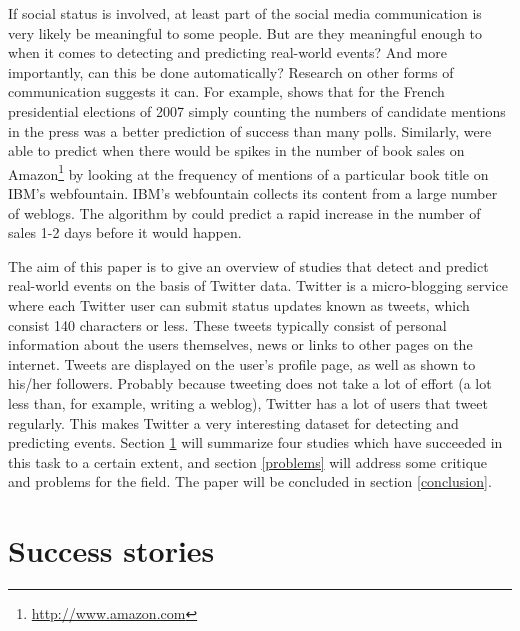 \documentclass[12pt]{article}
\begin{document}

If social status is involved, at least part of the social media communication is very likely be meaningful to some people. But are they meaningful enough to when it comes to detecting and predicting real-world events? And more importantly, can this be done automatically? Research on other forms of communication suggests it can. For example,  shows that for the French presidential elections of 2007 simply counting the numbers of candidate mentions in the press was a better prediction of success than many polls. Similarly,  were able to predict when there would be spikes in the number of book sales on Amazon\footnote{\url{http://www.amazon.com}} by looking at the frequency of mentions of a particular book title on IBM's webfountain. IBM's webfountain collects its content from a large number of weblogs. The algorithm by  could predict a rapid increase in the number of sales 1-2 days before it would happen.

The aim of this paper is to give an overview of studies that detect and predict real-world events on the basis of Twitter data. Twitter is a micro-blogging service where each Twitter user can submit status updates known as tweets, which consist 140 characters or less. These tweets typically consist of personal information about the users themselves, news or links to other pages on the internet. Tweets are displayed on the user’s profile page, as well as shown to his/her followers. Probably because tweeting does not take a lot of effort (a lot less than, for example, writing a weblog), Twitter has a lot of users that tweet regularly. This makes Twitter a very interesting dataset for detecting and predicting events. Section \ref{success} will summarize four studies which have succeeded in this task to a certain extent, and section \ref{problems} will address some critique and problems for the field. The paper will be concluded in section \ref{conclusion}.

\section{Success stories} \label{success}
\end{document}
